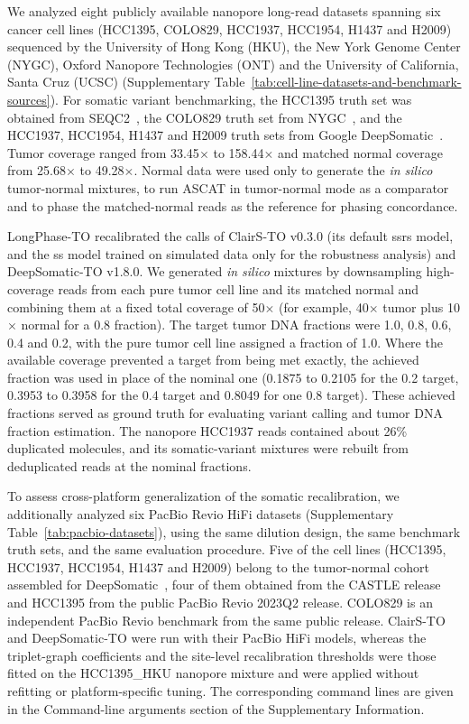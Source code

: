 \documentclass[unnumsec,webpdf,contemporary,large]{oup-authoring-template}
\begin{document}
We analyzed eight publicly available nanopore long-read datasets spanning six cancer cell lines (HCC1395, COLO829, HCC1937, HCC1954, H1437 and H2009) sequenced by the University of Hong Kong (HKU), the New York Genome Center (NYGC), Oxford Nanopore Technologies (ONT) and the University of California, Santa Cruz (UCSC) (Supplementary Table~\ref{tab:cell-line-datasets-and-benchmark-sources}). For somatic variant benchmarking, the HCC1395 truth set was obtained from SEQC2~\cite{fang2021}, the COLO829 truth set from NYGC~\cite{arora2019}, and the HCC1937, HCC1954, H1437 and H2009 truth sets from Google DeepSomatic~\cite{park2024}. Tumor coverage ranged from 33.45$\times$ to 158.44$\times$ and matched normal coverage from 25.68$\times$ to 49.28$\times$. Normal data were used only to generate the \emph{in silico} tumor-normal mixtures, to run ASCAT in tumor-normal mode as a comparator and to phase the matched-normal reads as the reference for phasing concordance.

LongPhase-TO recalibrated the calls of ClairS-TO v0.3.0 (its default ssrs model, and the ss model trained on simulated data only for the robustness analysis) and DeepSomatic-TO v1.8.0. We generated \emph{in silico} mixtures by downsampling high-coverage reads from each pure tumor cell line and its matched normal and combining them at a fixed total coverage of 50$\times$ (for example, 40$\times$ tumor plus 10$\times$ normal for a 0.8 fraction). The target tumor DNA fractions were 1.0, 0.8, 0.6, 0.4 and 0.2, with the pure tumor cell line assigned a fraction of 1.0. Where the available coverage prevented a target from being met exactly, the achieved fraction was used in place of the nominal one (0.1875 to 0.2105 for the 0.2 target, 0.3953 to 0.3958 for the 0.4 target and 0.8049 for one 0.8 target). These achieved fractions served as ground truth for evaluating variant calling and tumor DNA fraction estimation. The nanopore HCC1937 reads contained about 26\% duplicated molecules, and its somatic-variant mixtures were rebuilt from deduplicated reads at the nominal fractions.

To assess cross-platform generalization of the somatic recalibration, we additionally analyzed six PacBio Revio HiFi datasets (Supplementary Table~\ref{tab:pacbio-datasets}), using the same dilution design, the same benchmark truth sets, and the same evaluation procedure. Five of the cell lines (HCC1395, HCC1937, HCC1954, H1437 and H2009) belong to the tumor-normal cohort assembled for DeepSomatic~\cite{park2024}, four of them obtained from the CASTLE release and HCC1395 from the public PacBio Revio 2023Q2 release. COLO829 is an independent PacBio Revio benchmark from the same public release. ClairS-TO and DeepSomatic-TO were run with their PacBio HiFi models, whereas the triplet-graph coefficients and the site-level recalibration thresholds were those fitted on the HCC1395\_HKU nanopore mixture and were applied without refitting or platform-specific tuning. The corresponding command lines are given in the Command-line arguments section of the Supplementary Information.
\end{document}

